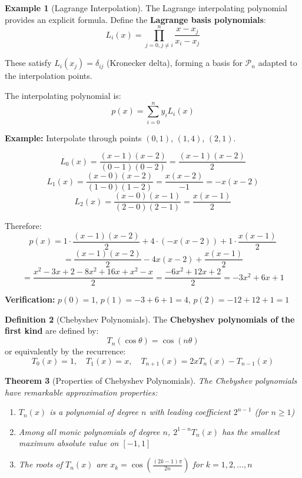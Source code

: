 \documentclass[12pt]{article}
\numberwithin{equation}{section}
\theoremstyle{plain}
\newtheorem{theorem}{Theorem}[section]
\theoremstyle{definition}
\newtheorem{definition}[theorem]{Definition}
\newtheorem{example}[theorem]{Example}
\theoremstyle{remark}
\begin{document}
\begin{example}[Lagrange Interpolation]
The Lagrange interpolating polynomial provides an explicit formula. Define the \textbf{Lagrange basis polynomials}:
$$L_i(x) = \prod_{j=0, j \neq i}^n \frac{x - x_j}{x_i - x_j}$$

These satisfy $L_i(x_j) = \delta_{ij}$ (Kronecker delta), forming a basis for $\mathcal{P}_n$ adapted to the interpolation points.

The interpolating polynomial is:
$$p(x) = \sum_{i=0}^n y_i L_i(x)$$

\textbf{Example:} Interpolate through points $(0,1)$, $(1,4)$, $(2,1)$.

$$L_0(x) = \frac{(x-1)(x-2)}{(0-1)(0-2)} = \frac{(x-1)(x-2)}{2}$$
$$L_1(x) = \frac{(x-0)(x-2)}{(1-0)(1-2)} = \frac{x(x-2)}{-1} = -x(x-2)$$
$$L_2(x) = \frac{(x-0)(x-1)}{(2-0)(2-1)} = \frac{x(x-1)}{2}$$

Therefore:
$$p(x) = 1 \cdot \frac{(x-1)(x-2)}{2} + 4 \cdot (-x(x-2)) + 1 \cdot \frac{x(x-1)}{2}$$
$$= \frac{(x-1)(x-2)}{2} - 4x(x-2) + \frac{x(x-1)}{2}$$
$$= \frac{x^2 - 3x + 2 - 8x^2 + 16x + x^2 - x}{2} = \frac{-6x^2 + 12x + 2}{2} = -3x^2 + 6x + 1$$

\textbf{Verification:} $p(0) = 1$, $p(1) = -3 + 6 + 1 = 4$, $p(2) = -12 + 12 + 1 = 1$ \checkmark
\end{example}

\begin{definition}[Chebyshev Polynomials]
The \textbf{Chebyshev polynomials of the first kind} are defined by:
$$T_n(\cos\theta) = \cos(n\theta)$$
or equivalently by the recurrence:
$$T_0(x) = 1, \quad T_1(x) = x, \quad T_{n+1}(x) = 2xT_n(x) - T_{n-1}(x)$$
\end{definition}

\begin{theorem}[Properties of Chebyshev Polynomials]
The Chebyshev polynomials have remarkable approximation properties:
\begin{enumerate}
\item $T_n(x)$ is a polynomial of degree $n$ with leading coefficient $2^{n-1}$ (for $n \geq 1$)
\item Among all monic polynomials of degree $n$, $2^{1-n}T_n(x)$ has the smallest maximum absolute value on $[-1,1]$
\item The roots of $T_n(x)$ are $x_k = \cos\left(\frac{(2k-1)\pi}{2n}\right)$ for $k = 1, 2, \ldots, n$
\end{enumerate}
\end{theorem}
\end{document}
